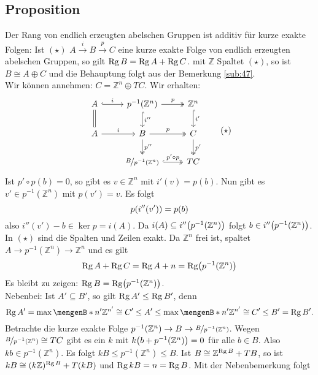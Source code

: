 \subsection[Proposition: Der Rang ist für kurze exakte Folgen endl. erz., abelscher Gruppen additiv]{Proposition} %
\label{sub:48}
Der Rang von endlich erzeugten abelschen Gruppen ist additiv für kurze exakte Folgen: Ist $(\star)$ $A \xrightarrow{i} B \xrightarrow{p}C$ eine kurze exakte Folge von endlich 
erzeugten abelschen Gruppen, so gilt $\Rg B = \Rg A + \Rg C$.
mit $\mathds{Z}$
Spaltet $(\star)$, so ist $B \cong A \oplus C$ und die Behauptung folgt aus der Bemerkung \ref{sub:47}. \smallskip \\
Wir können annehmen: $C = \mathds{Z}^n \oplus T C$. Wir erhalten: 
\[
	\begin{tikzcd}
		A \rar["i",hook] \dar[equal] & p ^{-1}(\mathds{Z}^n) \rar["p", two heads] \dar[hook,"i''"]& \mathds{Z}^n \dar[hook,"i'"]\\
		A \rar["i"] & B \rar["p", two heads] \dar[two heads,"p''"]& C \dar[two heads,"p'"]\\
		& \nicefrac{B}{p ^{-1}(\mathds{Z}^n)} \rar[two heads, hook,"p' \circ p"]& T C
	\end{tikzcd} \tag*{$(\star)$}
\]
Ist $p' \circ p(b)=0$, so gibt es $v \in \mathds{Z}^n$ mit $i'(v)= p(b)$. Nun gibt es $v' \in p ^{-1}(\mathds{Z}^n)$ mit $p(v')=v$. Es folgt 
\[
	p \enbrace*{i''(v')} = p(b) 
\]
also $i''(v') -b \in \ker p = i(A)$. Da $i(A) \subseteq i'' \enbrace*{p ^{-1} (\mathds{Z}^n)} $ folgt $b \in i'' \enbrace*{p ^{-1}(\mathds{Z}^n)}$.
In $(\star)$ sind die Spalten und Zeilen exakt. Da $\mathds{Z}^n$ frei ist, spaltet $A \to p ^{-1}(\mathds{Z}^n) \to \mathds{Z}^n$ und es gilt 
\[
	\Rg A + \Rg C = \Rg A + n = \Rg \enbrace*{p ^{-1}(\mathds{Z}^n)} 
\]
Es bleibt zu zeigen: $\Rg B = \Rg  \enbrace*{p ^{-1}(\mathds{Z}^n)}$. \medskip \\
Nebenbei: Ist $A' \subseteq B'$, so gilt $\Rg A' \le \Rg B'$, denn 
\[
	\Rg A' = \max \set[n']{\mathds{Z}^{n'} \cong C' \le A'} \le \max \set[n']{\mathds{Z}^{n'} \cong C' \le B'} = \Rg B'.
\]
Betrachte die kurze exakte Folge $p ^{-1}(\mathds{Z}^n) \to B  \to \nicefrac{B}{p ^{-1}(\mathds{Z}^n)}$. Wegen $\nicefrac{B}{p ^{-1}(\mathds{Z}^n)} \cong T C$ gibt es ein
$k$ mit $k \enbrace*{b+ p ^{-1}(\mathds{Z}^n)} =0$ für alle $b \in B$. Also $k b \in p ^{-1}(\mathds{Z}^n)$. Es folgt $kB \le p ^{-1}(\mathds{Z}^n) \le B$. Ist 
$B \cong \mathds{Z}^{\Rg B}+ TB$, so ist $k B \cong (k \mathds{Z})^{\Rg B}+ T(kB)$ und $\Rg kB = n = \Rg B$. Mit der Nebenbemerkung folgt 
